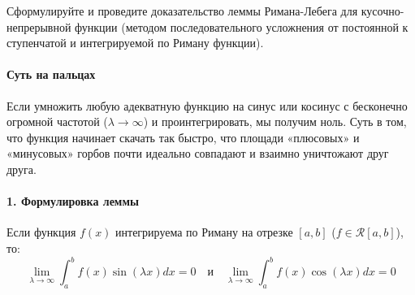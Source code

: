 {Сформулируйте и проведите доказательство леммы Римана-Лебега для кусочно-непрерывной функции (методом последовательного усложнения от постоянной к ступенчатой и интегрируемой по Риману функции).}

\paragraph{Суть на пальцах}
Если умножить любую адекватную функцию на синус или косинус с бесконечно огромной частотой ($\lambda \to \infty$) и проинтегрировать, мы получим ноль. Суть в том, что функция начинает скачать так быстро, что площади «плюсовых» и «минусовых» горбов почти идеально совпадают и взаимно уничтожают друг друга.

\paragraph{1. Формулировка леммы}
Если функция $f(x)$ интегрируема по Риману на отрезке $[a, b]$ ($f \in \mathcal{R}[a,b]$), то:
$$ \lim_{\lambda \to \infty} \int_a^b f(x) \sin(\lambda x) dx = 0 \quad \text{и} \quad \lim_{\lambda \to \infty} \int_a^b f(x) \cos(\lambda x) dx = 0 $$

